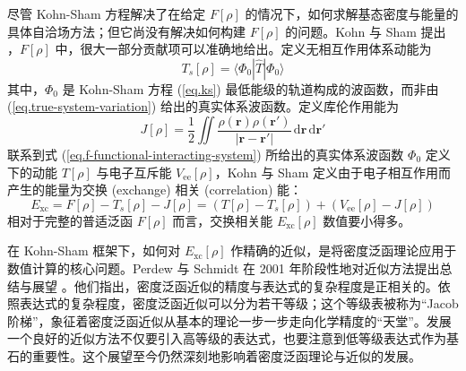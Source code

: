 尽管 Kohn-Sham 方程解决了在给定 $F[\rho]$ 的情况下，如何求解基态密度与能量的具体自洽场方法；但它尚没有解决如何构建 $F[\rho]$ 的问题。Kohn 与 Sham 提出 \cite{Kohn-Sham.PR.1965}，$F[\rho]$ 中，很大一部分贡献项可以准确地给出。定义无相互作用体系动能为
\begin{equation}
  T_s[\rho] = \langle \Phi_0 | \hat T | \Phi_0 \rangle
\end{equation}
其中，$\Phi_0$ 是 Kohn-Sham 方程 (\ref{eq.ks}) 最低能级的轨道构成的波函数，而非由 (\ref{eq.true-system-variation}) 给出的真实体系波函数。定义库伦作用能为
\begin{equation}
  J[\rho] = \frac{1}{2} \iint \frac{\rho(\bm{r}) \rho(\bm{r}')}{|\bm{r} - \bm{r}'|} \, \mathrm{d} \bm{r} \, \mathrm{d} \bm{r}'
\end{equation}
联系到式 (\ref{eq.f-functional-interacting-system}) 所给出的真实体系波函数 $\Phi_0$ 定义下的动能 $T[\rho]$ 与电子互斥能 $V_\mathrm{ee} [\rho]$，Kohn 与 Sham 定义由于电子相互作用而产生的能量为交换 (exchange) 相关 (correlation) 能：
\begin{equation}
  E_\mathrm{xc} = F[\rho] - T_s[\rho] - J[\rho] = (T[\rho] - T_s[\rho]) + (V_\mathrm{ee} [\rho] - J[\rho])
\end{equation}
相对于完整的普适泛函 $F[\rho]$ 而言，交换相关能 $E_\mathrm{xc}[\rho]$ 数值要小得多。

在 Kohn-Sham 框架下，如何对 $E_\mathrm{xc}[\rho]$ 作精确的近似，是将密度泛函理论应用于数值计算的核心问题。Perdew 与 Schmidt 在 2001 年阶段性地对近似方法提出总结与展望 \cite{Perdew-Schmidt.ACP.2001}。他们指出，密度泛函近似的精度与表达式的复杂程度是正相关的。依照表达式的复杂程度，密度泛函近似可以分为若干等级；这个等级表被称为“Jacob 阶梯”，象征着密度泛函近似从基本的理论一步一步走向化学精度的“天堂”。发展一个良好的近似方法不仅要引入高等级的表达式，也要注意到低等级表达式作为基石的重要性。这个展望至今仍然深刻地影响着密度泛函理论与近似的发展。

